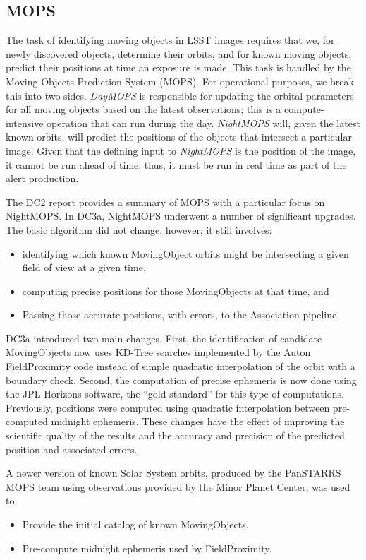 
\subsection{MOPS}

The task of identifying moving objects in LSST images requires that
we, for newly discovered objects, determine their orbits, and for
known moving objects, predict their positions at time an exposure is
made.  This task is handled by the Moving Objects Prediction System
(MOPS).  For operational purposes, we break this into two sides.  {\it
  DayMOPS} is responsible for updating the orbital parameters for all
moving objects based on the latest observations; this is a 
compute-intensive operation that can run during the day.  {\it
  NightMOPS} will, given the latest known orbits, will predict the
positions of the objects that intersect a particular image.  Given
that the defining input to {\it NightMOPS} is the position of the
image, it cannot be run ahead of time; thus, it must be run in real
time as part of the alert production.  

The DC2 report provides a summary of MOPS with a particular focus on
NightMOPS.  In DC3a, NightMOPS underwent a number of significant 
upgrades.  The basic algorithm did not change, however; it still involves:
\begin{itemize}
    \item identifying which known MovingObject orbits might be intersecting a 
          given field of view at a given time,
    \item computing precise positions for those MovingObjects at that
      time, and 
    \item Passing those accurate positions, with errors, to the Association 
          pipeline.
\end{itemize}

DC3a introduced two main changes.  First, the identification of
candidate MovingObjects now uses KD-Tree searches implemented by the
Auton FieldProximity code instead of simple quadratic interpolation of
the orbit with a boundary check.  Second, the computation of precise
ephemeris is now done using the JPL Horizons software, the ``gold
standard'' for this type of computations.  Previously, positions were
computed using quadratic interpolation between pre-computed midnight
ephemeris.  These changes have the effect of improving the scientific
quality of the results and the accuracy and precision of the predicted
position and associated errors. 

A newer version of known Solar System orbits, produced by the PanSTARRS MOPS 
team using observations provided by the Minor Planet Center, was used to
\begin{itemize}
    \item Provide the initial catalog of known MovingObjects.
    \item Pre-compute midnight ephemeris used by FieldProximity.
\end{itemize}









